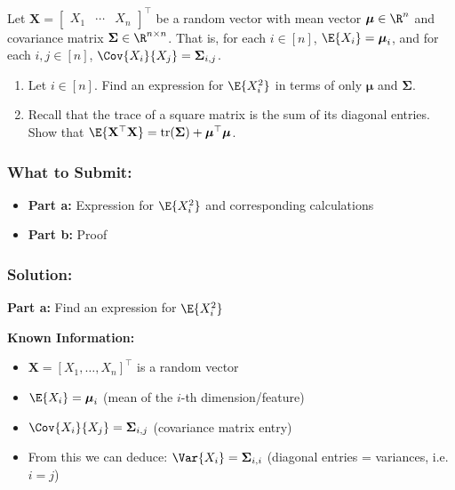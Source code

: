 \documentclass{article}
\begin{document}
\clearpage{}
\begin{aprob}
    Let $\mathbf{X} = \begin{bmatrix}
        X_1 & \cdots & X_n
    \end{bmatrix}^\top$ be a random vector with mean vector $\boldsymbol{\mu} \in \R^n$ and covariance matrix $\boldsymbol\Sigma \in \R^{n \times n}$. That is, for each $i \in [n]$, $\E {X_i} =\boldsymbol\mu_i$, and for each $i,j \in [n]$, $\Cov{X_i}{X_j} = \boldsymbol\Sigma_{i,j}$.
    \begin{enumerate}
        \item {} Let $i \in [n]$. Find an expression for $\E{X_i^2}$ in terms of only $\boldsymbol\mu$ and $\boldsymbol\Sigma$.
        \item {} Recall that the trace of a square matrix is the sum of its diagonal entries. Show that $\E{\mathbf{X}^\top \mathbf{X}} = \mathrm{tr}(\boldsymbol\Sigma) + \boldsymbol\mu^\top\boldsymbol\mu$. \\
    \end{enumerate}

    \subsubsection*{What to Submit:}
    \begin{itemize}
        \item \textbf{Part a:} Expression for $\E{X_i^2}$ and corresponding calculations
        \item \textbf{Part b:} Proof
    \end{itemize}

    \subsubsection*{Solution:}

    \begin{mdframed}
    \textbf{\large Part a:} Find an expression for $\E{X_i^2}$
    \end{mdframed}

    \textbf{Known Information:}
    \begin{itemize}
        \item $\mathbf{X} = [X_1, \ldots, X_n]^\top$ is a random vector
        \item $\E{X_i} = \boldsymbol\mu_i$ (mean of the $i$-th dimension/feature)
        \item $\Cov{X_i}{X_j} = \boldsymbol\Sigma_{i,j}$ (covariance matrix entry)
        \item From this we can deduce: $\Var{X_i} = \boldsymbol\Sigma_{i,i}$ (diagonal entries = variances, i.e.\ $i = j$)
    \end{itemize}


\end{aprob}
\end{document}
